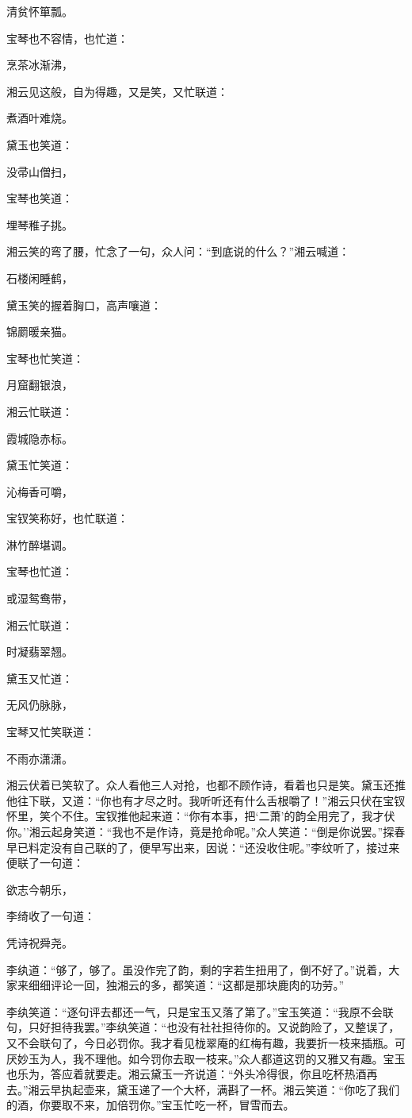 清贫怀箪瓢。

宝琴也不容情，也忙道：

烹茶冰渐沸，

湘云见这般，自为得趣，又是笑，又忙联道：

煮酒叶难烧。

黛玉也笑道：

没帚山僧扫，

宝琴也笑道：

埋琴稚子挑。

湘云笑的弯了腰，忙念了一句，众人问：``到底说的什么？''湘云喊道：

石楼闲睡鹤，

黛玉笑的握着胸口，高声嚷道：

锦罽暖亲猫。

宝琴也忙笑道：

月窟翻银浪，

湘云忙联道：

霞城隐赤标。

黛玉忙笑道：

沁梅香可嚼，

宝钗笑称好，也忙联道：

淋竹醉堪调。

宝琴也忙道：

或湿鸳鸯带，

湘云忙联道：

时凝翡翠翘。

黛玉又忙道：

无风仍脉脉，

宝琴又忙笑联道：

不雨亦潇潇。

湘云伏着已笑软了。众人看他三人对抢，也都不顾作诗，看着也只是笑。黛玉还推他往下联，又道：``你也有才尽之时。我听听还有什么舌根嚼了！''湘云只伏在宝钗怀里，笑个不住。宝钗推他起来道：``你有本事，把`二萧'的韵全用完了，我才伏你。''湘云起身笑道：``我也不是作诗，竟是抢命呢。''众人笑道：``倒是你说罢。''探春早已料定没有自己联的了，便早写出来，因说：``还没收住呢。''李纹听了，接过来便联了一句道：

欲志今朝乐，

李绮收了一句道：

凭诗祝舜尧。

李纨道：``够了，够了。虽没作完了韵，剩的字若生扭用了，倒不好了。''说着，大家来细细评论一回，独湘云的多，都笑道：``这都是那块鹿肉的功劳。''

李纨笑道：``逐句评去都还一气，只是宝玉又落了第了。''宝玉笑道：``我原不会联句，只好担待我罢。''李纨笑道：``也没有社社担待你的。又说韵险了，又整误了，又不会联句了，今日必罚你。我才看见栊翠庵的红梅有趣，我要折一枝来插瓶。可厌妙玉为人，我不理他。如今罚你去取一枝来。''众人都道这罚的又雅又有趣。宝玉也乐为，答应着就要走。湘云黛玉一齐说道：``外头冷得很，你且吃杯热酒再去。''湘云早执起壶来，黛玉递了一个大杯，满斟了一杯。湘云笑道：``你吃了我们的酒，你要取不来，加倍罚你。''宝玉忙吃一杯，冒雪而去。

